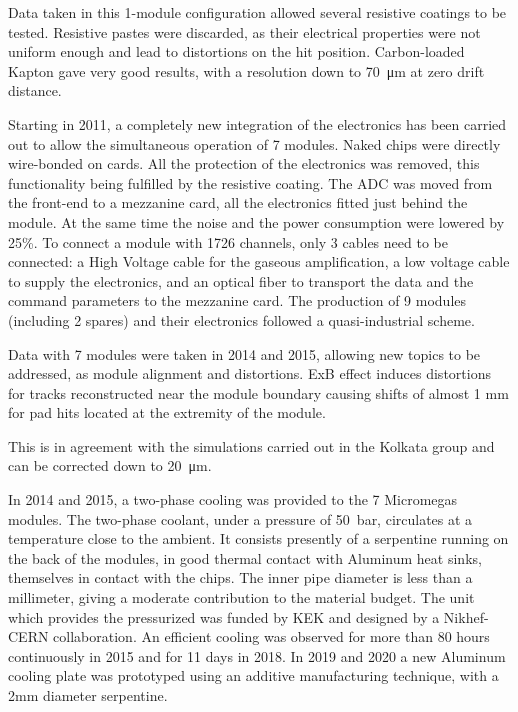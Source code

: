 Data taken in this 1-module configuration allowed several resistive coatings to be tested. Resistive pastes were discarded, as
their electrical properties were not uniform enough and lead to distortions on the hit position. Carbon-loaded Kapton gave
very good results, with a resolution down to \SI{70}{\micro \meter} at zero drift distance.

Starting in 2011, a completely new integration of the electronics has been carried out to allow the simultaneous operation
of 7 modules. Naked chips were directly wire-bonded on cards. All the protection of the electronics was removed, this functionality
being fulfilled by the resistive coating. The ADC was moved from the front-end to a mezzanine card, all the electronics fitted just behind the module.
At the same time the noise and the power consumption were lowered by 25\%. To connect a module with 1726 channels, only
3 cables need to be connected: a High Voltage cable for the gaseous amplification, a low voltage cable to supply the electronics,
and an optical fiber to transport the data and the command parameters to the mezzanine card.
The production of 9 modules (including 2 spares) and their electronics followed a quasi-industrial scheme.

Data with 7 modules were taken in 2014 and 2015, allowing new topics to be addressed, as module alignment and distortions.
ExB effect induces distortions for tracks reconstructed near the module boundary causing
shifts of almost 1 mm for pad hits located at the extremity of the module.


This is
in agreement with the simulations carried out in the Kolkata group and can be corrected down to \SI{20}{\micro \meter}.

In 2014 and 2015, a two-phase  cooling was provided to the 7 Micromegas modules. The two-phase coolant, under a pressure of \SI{50}{bar}, circulates at a temperature close to the ambient.
It consists presently of a serpentine running on the back of the modules, in good thermal contact with Aluminum heat sinks, themselves in contact with the chips. The inner pipe diameter is less than a millimeter, giving a moderate contribution to the material budget. The unit
which provides the pressurized  was funded by KEK and designed by a Nikhef-CERN collaboration.
An efficient cooling was observed for more than 80 hours continuously in 2015 and for 11 days in 2018. In 2019 and 2020 a new Aluminum cooling plate was prototyped using an additive manufacturing technique, with a 2mm diameter serpentine. 

